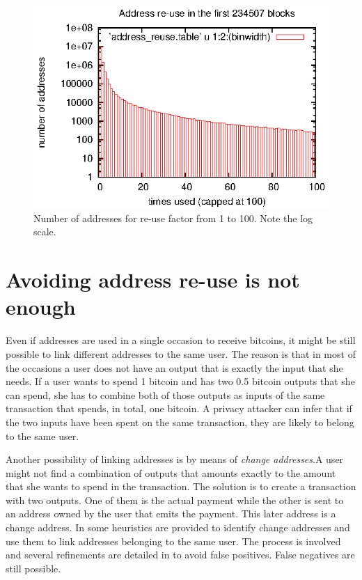 \documentclass[journal]{IEEEtran}
\begin{document}
\begin{figure}[!t]
\centering
\includegraphics[width=\linewidth]{figures/address-reuse.eps}
\caption{Number of addresses for re-use factor from 1 to 100. Note the log scale.}
\label{fig:address-reuse}
\end{figure}

\section{Avoiding address re-use is not enough}

Even if addresses are used in a single occasion to receive bitcoins, it might be still possible to link different addresses to the same user.
The reason is that in most of the occasions a user does not have an output that is exactly the input that she needs.
If a user wants to spend 1 bitcoin and has two 0.5 bitcoin outputs that she can spend, she has to combine both of those outputs as inputs of the same transaction that spends, in total, one bitcoin.
A privacy attacker can infer that if the two inputs have been spent on the same transaction, they are likely to belong to the same user.

Another possibility of linking addresses is by means of \emph{change addresses}.A user might not find a combination of outputs that amounts exactly to the amount that she wants to spend in the transaction.
The solution is to create a transaction with two outputs. 
One of them is the actual payment while the other is sent to an address owned by the user that emits the payment.
This later address is a change address.
In \cite{meiklejohn2013fbc} some heuristics are provided to identify change addresses and use them to link addresses belonging to the same user.
The process is involved and several refinements are detailed  in \cite{meiklejohn2013fbc} to avoid false positives.
False negatives are still possible.
\end{document}
